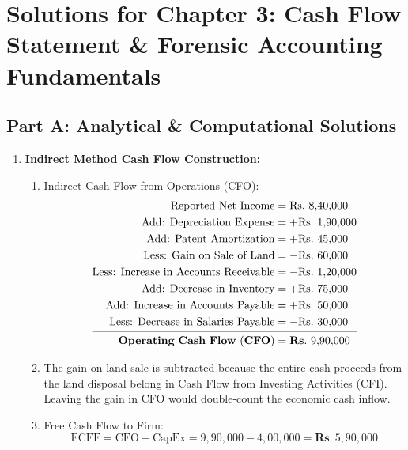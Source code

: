 \newpage
\section*{Solutions for Chapter 3: Cash Flow Statement \& Forensic Accounting Fundamentals}

\subsection*{Part A: Analytical \& Computational Solutions}

\begin{enumerate}[label=\textbf{P3.\arabic*}]
    \item \textbf{Indirect Method Cash Flow Construction:}
    \begin{enumerate}[label=(\alph*)]
        \item Indirect Cash Flow from Operations (CFO):
        \begin{align*}
        \text{Reported Net Income} &= \text{Rs.~} 8{,}40{,}000 \\
        \text{Add: Depreciation Expense} &= +\text{Rs.~} 1{,}90{,}000 \\
        \text{Add: Patent Amortization} &= +\text{Rs.~} 45{,}000 \\
        \text{Less: Gain on Sale of Land} &= -\text{Rs.~} 60{,}000 \\
        \text{Less: Increase in Accounts Receivable} &= -\text{Rs.~} 1{,}20{,}000 \\
        \text{Add: Decrease in Inventory} &= +\text{Rs.~} 75{,}000 \\
        \text{Add: Increase in Accounts Payable} &= +\text{Rs.~} 50{,}000 \\
        \text{Less: Decrease in Salaries Payable} &= -\text{Rs.~} 30{,}000 \\
        \midrule
        \mathbf{Operating\ Cash\ Flow\ (CFO)} &= \mathbf{Rs.~} 9{,}90{,}000
        \end{align*}
        \item The gain on land sale is subtracted because the entire cash proceeds from the land disposal belong in Cash Flow from Investing Activities (CFI). Leaving the gain in CFO would double-count the economic cash inflow.
        \item Free Cash Flow to Firm:
        \begin{equation*}
        \text{FCFF} = \text{CFO} - \text{CapEx} = 9{,}90{,}000 - 4{,}00{,}000 = \mathbf{Rs.~} 5{,}90{,}000
        \end{equation*}
    \end{enumerate}


\end{enumerate}
